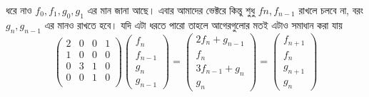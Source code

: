 ধরে নাও $f_{0}, f_{1}, g_{0}, g_{1}$ এর মান জানা আছে। এবার আমাদের ভেক্টরে কিন্তু শুধু $f{n}, f_{n - 1}$ রাখলে চলবে না, বরং $g_{n}, g_{n - 1}$ এর মানও রাখতে হবে। যদি এটা ধরতে পারো তাহলে আগেরগুলোর মতই এটাও সমাধান করা যায় 
$$
\begin{pmatrix}
2 & 0 & 0 & 1 \\
1 & 0 & 0 & 0 \\
0 & 3 & 1 & 0 \\
0 & 0 & 1 & 0 \\
\end{pmatrix} 
\begin{pmatrix}
f_{n} \\
f_{n - 1} \\ 
g_{n} \\
g_{n - 1}
\end{pmatrix}
= 
\begin{pmatrix}
2f_{n} + g_{n - 1}\\
f_{n} \\
3f_{n - 1} + g_{n} \\
g_{n} 
\end{pmatrix}
=
\begin{pmatrix}
f_{n + 1} \\
f_{n} \\
g_{n + 1} \\
g_{n}
\end{pmatrix}
$$ 

$$

